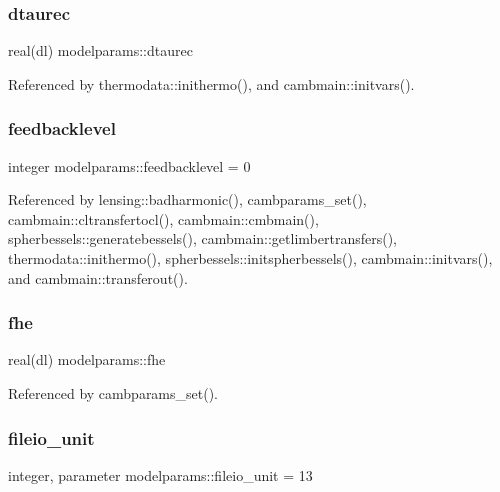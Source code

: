 \subsubsection{\texorpdfstring{dtaurec}{dtaurec}}
{\footnotesize\ttfamily real(dl) modelparams\+::dtaurec}



Referenced by thermodata\+::inithermo(), and cambmain\+::initvars().

\mbox{\label{namespacemodelparams_a403353ede075646b189fcfbae0fb3396}} 
\subsubsection{\texorpdfstring{feedbacklevel}{feedbacklevel}}
{\footnotesize\ttfamily integer modelparams\+::feedbacklevel = 0}



Referenced by lensing\+::badharmonic(), cambparams\+\_\+set(), cambmain\+::cltransfertocl(), cambmain\+::cmbmain(), spherbessels\+::generatebessels(), cambmain\+::getlimbertransfers(), thermodata\+::inithermo(), spherbessels\+::initspherbessels(), cambmain\+::initvars(), and cambmain\+::transferout().

\mbox{\label{namespacemodelparams_a237a630b241207072c775a0a483fccf2}} 
\subsubsection{\texorpdfstring{fhe}{fhe}}
{\footnotesize\ttfamily real(dl) modelparams\+::fhe}



Referenced by cambparams\+\_\+set().

\mbox{\label{namespacemodelparams_ac3257ef5df85ecef99f684ac5b101b71}} 
\subsubsection{\texorpdfstring{fileio\+\_\+unit}{fileio\_unit}}
{\footnotesize\ttfamily integer, parameter modelparams\+::fileio\+\_\+unit = 13}



